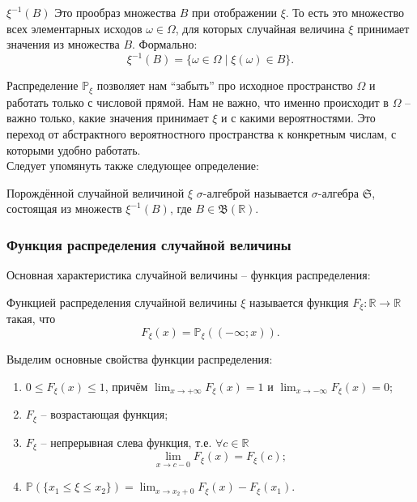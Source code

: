 $\xi^{-1}(B)$ Это прообраз множества $B$ при отображении $\xi$. То есть это множество всех элементарных исходов $\omega \in \Omega$, для которых случайная величина $\xi$ принимает значения из множества $B$. Формально:
\[
\xi^{-1}(B) = \{\omega \in \Omega \mid \xi(\omega) \in B\}.
\]

Распределение $\mathbb{P}_{\xi}$ позволяет нам ``забыть'' про исходное пространство $\Omega$ и работать только с числовой прямой. Нам не важно, что именно происходит в $\Omega$ -- важно только, какие значения принимает $\xi$ и с какими вероятностями. Это переход от абстрактного вероятностного пространства к конкретным числам, с которыми удобно работать.\\

Следует упомянуть также следующее определение:
\begin{definition}
Порождённой случайной величиной $\xi$ $\sigma$-алгеброй называется $\sigma$-алгебра $\mathfrak{S}$, состоящая из множеств $\xi^{-1}(B)$, где $B \in \mathfrak{B}(\mathbb{R})$.
\end{definition}

\subsubsection{Функция распределения случайной величины}



Основная характеристика случайной величины -- функция распределения:

\begin{definition}
Функцией распределения случайной величины $\xi$ называется функция $F_{\xi}: \mathbb{R} \to \mathbb{R}$ такая, что
\[
F_{\xi}(x) = \mathbb{P}_{\xi}((-\infty; x)).
\]
\end{definition}

\begin{notice}
Выделим основные свойства функции распределения:
\begin{enumerate}
    \item $0 \leqslant F_{\xi}(x) \leqslant 1$, причём $\lim_{x \to +\infty} F_{\xi}(x) = 1$ и $\lim_{x \to -\infty} F_{\xi}(x) = 0$;
    \item $F_{\xi}$ -- возрастающая функция;
    \item $F_{\xi}$ -- непрерывная слева функция, т.е. $\forall c \in \mathbb{R}$
    \[
    \lim_{x \to c-0} F_{\xi}(x) = F_{\xi}(c);
    \]
    \item $\mathbb{P}(\{x_1 \leqslant \xi \leqslant x_2\}) = \lim_{x \to x_2+0} F_{\xi}(x) - F_{\xi}(x_1)$.
\end{enumerate}
\end{notice}

